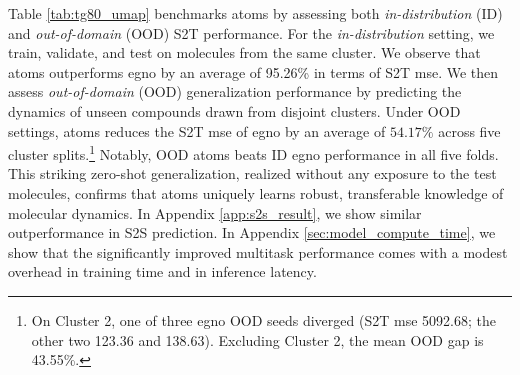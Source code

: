 Table \ref{tab:tg80_umap} benchmarks \gls{atoms} by assessing both \textit{in-distribution} (ID) and \textit{out-of-domain} (OOD) S2T performance. For the \textit{in-distribution} setting, we train, validate, and test on molecules from the same cluster. We observe that \gls{atoms} outperforms \gls{egno} by an average of 95.26\% in terms of S2T \gls{mse}. We then assess \textit{out-of-domain} (OOD) generalization performance by predicting the dynamics of unseen compounds drawn from disjoint clusters. Under OOD settings, \gls{atoms} reduces the S2T \gls{mse} of \gls{egno} by an average of $54.17\%$ across five cluster splits.\footnote{On Cluster 2, one of three \gls{egno} OOD seeds diverged (S2T \gls{mse} 5092.68; the other two 123.36 and 138.63). Excluding Cluster 2, the mean OOD gap is 43.55\%.} Notably, OOD \gls{atoms} beats ID \gls{egno} performance in all five folds. This striking zero-shot generalization, realized without any exposure to the test molecules, confirms that \gls{atoms} uniquely learns robust, transferable knowledge of molecular dynamics. In Appendix \ref{app:s2s_result}, we show similar outperformance in S2S prediction. In Appendix \ref{sec:model_compute_time}, we show that the significantly improved multitask performance comes with a modest overhead in training time and in inference latency.


